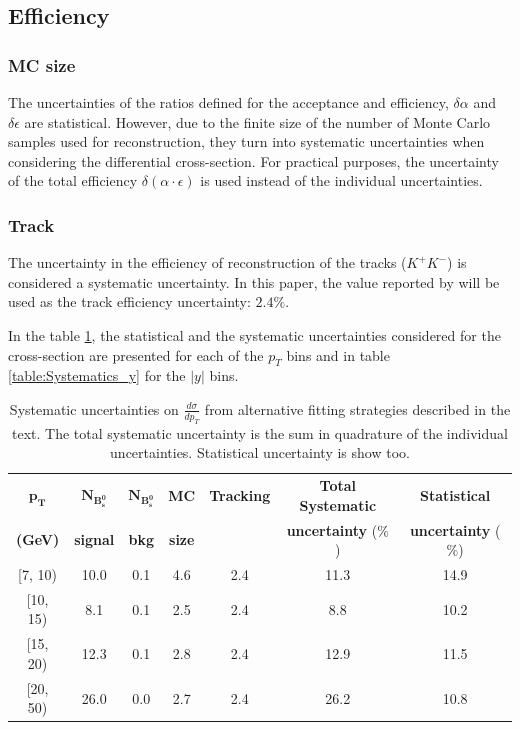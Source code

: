 \cleardoublepage
\subsection{Efficiency}

\subsubsection{MC size}
The uncertainties of the ratios defined for the acceptance and efficiency, $\delta \alpha$ and $\delta \epsilon$ are statistical. However, due to the finite size of the number of Monte Carlo samples used for reconstruction, they turn into systematic uncertainties when considering the differential cross-section. For practical purposes, the uncertainty of the total efficiency $\delta(\alpha \cdot \epsilon)$ is used instead of the individual uncertainties.


\subsubsection{Track}

The uncertainty in the efficiency of reconstruction of the tracks ($K^{+}K^{-}$) is considered a systematic uncertainty. In this paper, the value reported by \cite{cms2018tracking} will be used as the track efficiency uncertainty: $2.4\%$.

In the table \ref{table:Systematics}, the statistical and the systematic uncertainties considered for the cross-section are presented for each of the $p_T$ bins and in table \ref{table:Systematics_y} for the $|y|$ bins.
\begin{table}[htbp] \begin{center}\begin{tabular}{|c|c|c|c|c|c|c|}\hline$\mathbf{p_T}$    &  $\mathbf{N_{B_s^{0}}} $    &  $\mathbf{N_{B_s^{0}}} $  & \textbf{MC}   & \textbf{Tracking}  & \textbf{Total Systematic}  & \textbf{Statistical} \\\textbf{(GeV)}   & \textbf{signal}   & \textbf{bkg}    & \textbf{size} &           & \textbf{uncertainty} ($\mathbf{\%}$) & \textbf{uncertainty} ($\mathbf{\%}$) \\\hline{[}7, 10{)}  &  10.0  &  0.1 &  4.6  &  2.4 &  11.3 &  14.9 \\{[}10, 15{)}  &  8.1  &  0.1 &  2.5  &  2.4 &  8.8 &  10.2 \\{[}15, 20{)}  &  12.3  &  0.1 &  2.8  &  2.4 &  12.9 &  11.5 \\{[}20, 50{)}  &  26.0  &  0.0 &  2.7  &  2.4 &  26.2 &  10.8 \\\hline\end{tabular}\caption{Systematic uncertainties on  ${\frac{d \sigma}{dp_T}}$ from alternative fitting strategies described in the text. The total systematic uncertainty is the sum in quadrature of the individual uncertainties. Statistical uncertainty is show too.}\label{table:Systematics}\end{center}\end{table}

